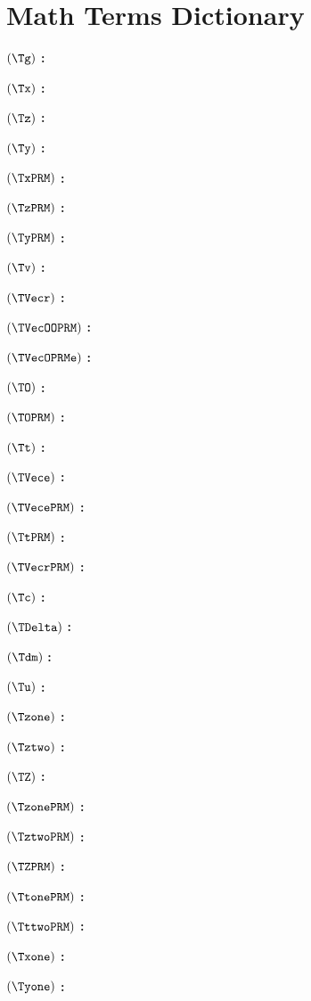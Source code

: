 \section*{Math Terms Dictionary}

$( \Tg )$ \textbf{:} \Tgdef

$( \Tx )$ \textbf{:} \Txdef

$( \Tz )$ \textbf{:} \Tzdef

$( \Ty )$ \textbf{:} \Tydef

$( \TxPRM )$ \textbf{:} \TxPRMdef

$( \TzPRM )$ \textbf{:} \TzPRMdef

$( \TyPRM )$ \textbf{:} \TyPRMdef

$( \Tv )$ \textbf{:} \Tvdef

$( \TVecr )$ \textbf{:} \TVecrdef

$( \TVecOOPRM )$ \textbf{:} \TVecOOPRMdef

$( \TVecOPRMe )$ \textbf{:} \TVecOPRMedef

$( \TO )$ \textbf{:} \TOdef

$( \TOPRM )$ \textbf{:} \TOPRMdef

$( \Tt )$ \textbf{:} \Ttdef

$( \TVece )$ \textbf{:} \TVecedef

$( \TVecePRM )$ \textbf{:} \TVecePRMdef

$( \TtPRM )$ \textbf{:} \TtPRMdef

$( \TVecrPRM )$ \textbf{:} \TVecrPRMdef

$( \Tc )$ \textbf{:} \Tcdef

$( \TDelta )$ \textbf{:} \TDeltadef

$( \Tdm)$ \textbf{:} \Tdmdef

$( \Tu )$ \textbf{:} \Tudef

$( \Tzone )$ \textbf{:} \Tzonedef

$( \Tztwo )$ \textbf{:} \Tztwodef

$( \TZ )$ \textbf{:} \TZdef

$( \TzonePRM )$ \textbf{:} \TzonePRMdef

$( \TztwoPRM )$ \textbf{:} \TztwoPRMdef

$( \TZPRM )$ \textbf{:} \TZPRMdef

$( \TtonePRM )$ \textbf{:} \TtonePRMdef

$( \TttwoPRM )$ \textbf{:} \TttwoPRMdef

$( \Txone )$ \textbf{:} \Txonedef

$( \Tyone )$ \textbf{:} \Tyonedef

